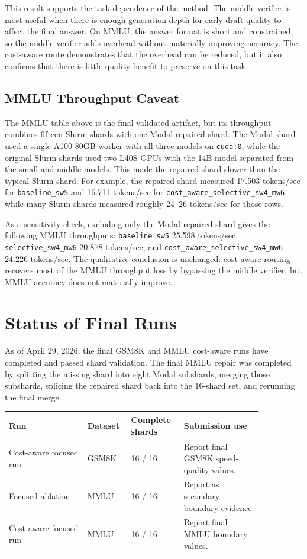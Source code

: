 \documentclass[11pt]{article}
\begin{document}
This result supports the task-dependence of the method. The middle verifier is most useful when there is enough generation depth for early draft quality to affect the final answer. On MMLU, the answer format is short and constrained, so the middle verifier adds overhead without materially improving accuracy. The cost-aware route demonstrates that the overhead can be reduced, but it also confirms that there is little quality benefit to preserve on this task.

\subsection{MMLU Throughput Caveat}

The MMLU table above is the final validated artifact, but its throughput combines fifteen Slurm shards with one Modal-repaired shard. The Modal shard used a single A100-80GB worker with all three models on \texttt{cuda:0}, while the original Slurm shards used two L40S GPUs with the 14B model separated from the small and middle models. This made the repaired shard slower than the typical Slurm shard. For example, the repaired shard measured 17.503 tokens/sec for \texttt{baseline\_sw5} and 16.711 tokens/sec for \texttt{cost\_aware\_selective\_sw4\_mw6}, while many Slurm shards measured roughly 24--26 tokens/sec for those rows.

As a sensitivity check, excluding only the Modal-repaired shard gives the following MMLU throughputs: \texttt{baseline\_sw5} 25.598 tokens/sec, \texttt{selective\_sw4\_mw6} 20.878 tokens/sec, and \texttt{cost\_aware\_selective\_sw4\_mw6} 24.226 tokens/sec. The qualitative conclusion is unchanged: cost-aware routing recovers most of the MMLU throughput loss by bypassing the middle verifier, but MMLU accuracy does not materially improve.

\section{Status of Final Runs}

As of April 29, 2026, the final GSM8K and MMLU cost-aware runs have completed and passed shard validation. The final MMLU repair was completed by splitting the missing shard into eight Modal subshards, merging those subshards, splicing the repaired shard back into the 16-shard set, and rerunning the final merge.

\begin{center}
\begin{tabular}{p{0.28\linewidth}p{0.12\linewidth}p{0.17\linewidth}p{0.28\linewidth}}
\toprule
Run & Dataset & Complete shards & Submission use \\
\midrule
Cost-aware focused run & GSM8K & 16 / 16 & Report final GSM8K speed-quality values. \\
Focused ablation & MMLU & 16 / 16 & Report as secondary boundary evidence. \\
Cost-aware focused run & MMLU & 16 / 16 & Report final MMLU boundary values. \\
\bottomrule
\end{tabular}
\end{center}
\end{document}
